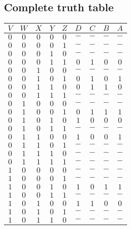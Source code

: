 \documentclass [15pt,a4paper,twoside]{article}
\begin{document}
\subsection{Complete truth table}
\begin{center}
	\begin{tabular}{ccccc|cccc}
		$V$ & $W$ & $X$ & $Y$ & $Z$ & $D$ & $C$ & $B$ & $A$ \\
		\hline
		$0$ & $0$ & $0$ & $0$ & $0$ & $-$ & $-$ & $-$ & $-$ \\
		$0$ & $0$ & $0$ & $0$ & $1$ & $-$ & $-$ & $-$ & $-$ \\
		$0$ & $0$ & $0$ & $1$ & $0$ & $-$ & $-$ & $-$ & $-$ \\
		$0$ & $0$ & $0$ & $1$ & $1$ & $0$ & $1$ & $0$ & $0$ \\
		$0$ & $0$ & $1$ & $0$ & $0$ & $-$ & $-$ & $-$ & $-$ \\
		$0$ & $0$ & $1$ & $0$ & $1$ & $0$ & $1$ & $0$ & $1$ \\
		$0$ & $0$ & $1$ & $1$ & $0$ & $0$ & $1$ & $1$ & $0$ \\
		$0$ & $0$ & $1$ & $1$ & $1$ & $-$ & $-$ & $-$ & $-$ \\
		$0$ & $1$ & $0$ & $0$ & $0$ & $-$ & $-$ & $-$ & $-$ \\
		$0$ & $1$ & $0$ & $0$ & $1$ & $0$ & $1$ & $1$ & $1$ \\
		$0$ & $1$ & $0$ & $1$ & $0$ & $1$ & $0$ & $0$ & $0$ \\
		$0$ & $1$ & $0$ & $1$ & $1$ & $-$ & $-$ & $-$ & $-$ \\
		$0$ & $1$ & $1$ & $0$ & $0$ & $1$ & $0$ & $0$ & $1$ \\
		$0$ & $1$ & $1$ & $0$ & $1$ & $-$ & $-$ & $-$ & $-$ \\
		$0$ & $1$ & $1$ & $1$ & $0$ & $-$ & $-$ & $-$ & $-$ \\
		$0$ & $1$ & $1$ & $1$ & $1$ & $-$ & $-$ & $-$ & $-$ \\
		$1$ & $0$ & $0$ & $0$ & $0$ & $-$ & $-$ & $-$ & $-$ \\
		$1$ & $0$ & $0$ & $0$ & $1$ & $-$ & $-$ & $-$ & $-$ \\
		$1$ & $0$ & $0$ & $1$ & $0$ & $1$ & $0$ & $1$ & $1$ \\
		$1$ & $0$ & $0$ & $1$ & $1$ & $-$ & $-$ & $-$ & $-$ \\
		$1$ & $0$ & $1$ & $0$ & $0$ & $1$ & $1$ & $0$ & $0$ \\
		$1$ & $0$ & $1$ & $0$ & $1$ & $-$ & $-$ & $-$ & $-$ \\
		$1$ & $0$ & $1$ & $1$ & $0$ & $-$ & $-$ & $-$ & $-$ \\

\end{tabular}
\end{center}
\end{document}
